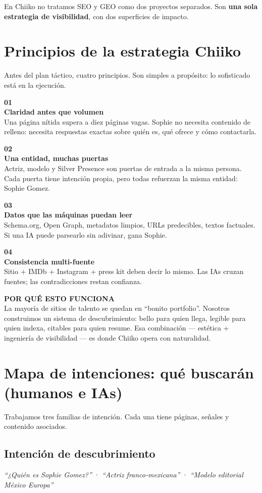 \documentclass[11pt,a4paper]{article}
\newcommand{\callout}[2]{%
  \par\noindent
  \colorbox{soft}{%
    \begin{minipage}{\dimexpr\textwidth-1.1cm\relax}
      \vspace{0.45em}
      {\sffamily\bfseries\footnotesize\color{mute}#1}\\[0.4em]
      {\color{ink}#2}
      \vspace{0.45em}
    \end{minipage}%
  }%
  \par\vspace{0.85em}
}
\newcommand{\pillar}[3]{%
  \par\noindent
  \begin{minipage}{\textwidth}
    {\sffamily\bfseries\footnotesize\color{mute}#1}\\[0.2em]
    {\sffamily\bfseries\large\color{ink}#2}\\[0.35em]
    {\color{ink}#3}
  \end{minipage}
  \par\vspace{0.35em}{\color{line}\hrule height 0.5pt}\vspace{0.75em}
}
\begin{document}
\vspace{0.6em}
En Chiiko no tratamos SEO y GEO como dos proyectos separados.
Son \textbf{una sola estrategia de visibilidad}, con dos superficies de impacto.

\section{Principios de la estrategia Chiiko}

Antes del plan táctico, cuatro principios. Son simples a propósito:
lo sofisticado está en la ejecución.

\pillar{01}{Claridad antes que volumen}{%
Una página nítida supera a diez páginas vagas. Sophie no necesita contenido de relleno:
necesita respuestas exactas sobre quién es, qué ofrece y cómo contactarla.}

\pillar{02}{Una entidad, muchas puertas}{%
Actriz, modelo y Silver Presence son puertas de entrada a la misma persona.
Cada puerta tiene intención propia, pero todas refuerzan la misma entidad: Sophie Gomez.}

\pillar{03}{Datos que las máquinas puedan leer}{%
Schema.org, Open Graph, metadatos limpios, URLs predecibles, textos factuales.
Si una IA puede parsearlo sin adivinar, gana Sophie.}

\pillar{04}{Consistencia multi-fuente}{%
Sitio + IMDb + Instagram + press kit deben decir lo mismo.
Las IAs cruzan fuentes; las contradicciones restan confianza.}

\callout{POR QUÉ ESTO FUNCIONA}{%
La mayoría de sitios de talento se quedan en ``bonito portfolio''.
Nosotros construimos un sistema de descubrimiento: bello para quien llega,
legible para quien indexa, citables para quien resume.
Esa combinación --- estética + ingeniería de visibilidad --- es donde Chiiko opera con naturalidad.
}

\section{Mapa de intenciones: qué buscarán (humanos e IAs)}

Trabajamos tres familias de intención. Cada una tiene páginas, señales y contenido asociados.

\subsection{Intención de descubrimiento}
\emph{``¿Quién es Sophie Gomez?''} · \emph{``Actriz franco-mexicana''} · \emph{``Modelo editorial México Europa''}
\end{document}
